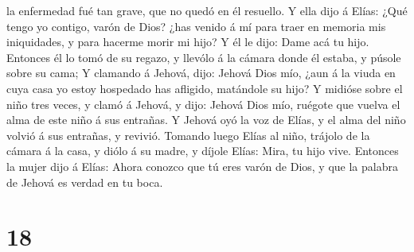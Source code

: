 la enfermedad fué tan grave, que no quedó en él resuello. 
Y ella dijo á Elías: ¿Qué tengo yo contigo, varón de Dios? ¿has venido á
mí para traer en memoria mis iniquidades, y para hacerme morir mi hijo?
 Y él le dijo: Dame acá tu hijo. Entonces él lo tomó de su
regazo, y llevólo á la cámara donde él estaba, y púsole sobre su cama;
 Y clamando á Jehová, dijo: Jehová Dios mío, ¿aun á la
viuda en cuya casa yo estoy hospedado has afligido, matándole su hijo?
 Y midióse sobre el niño tres veces, y clamó á Jehová, y
dijo: Jehová Dios mío, ruégote que vuelva el alma de este niño á sus
entrañas.  Y Jehová oyó la voz de Elías, y el alma del niño
volvió á sus entrañas, y revivió.  Tomando luego Elías al
niño, trájolo de la cámara á la casa, y diólo á su madre, y díjole
Elías: Mira, tu hijo vive.  Entonces la mujer dijo á Elías:
Ahora conozco que tú eres varón de Dios, y que la palabra de Jehová es
verdad en tu boca.

\hypertarget{section-17}{%
\section{18}\label{section-17}}

